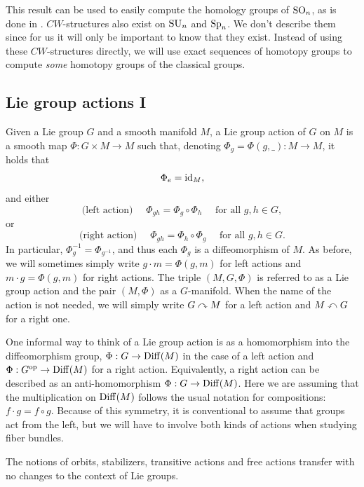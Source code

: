 This result can be used to easily compute the homology groups of $\operatorname{SO}_n$, as is done in \cite{Hatcher}. $CW$-structures also exist on $\operatorname{SU}_n$ and $\operatorname{Sp}_n$. We don't describe them since for us it will only be important to know that they exist. Instead of using these $CW$-structures directly, we will use exact sequences of homotopy groups to compute \emph{some} homotopy groups of the classical groups.





\subsection{Lie group actions I} \label{sec: Lie group actions}

\begin{defn}
    Given a Lie group $G$ and a smooth manifold $M$, a Lie group action of $G$ on $M$ is a smooth map $\Phi:G\times M\to M$ such that, denoting $\Phi_g=\Phi(g,\_):M\to M$, it holds that \[\Phi_e=\operatorname{id}_M,\] and either
    \[\text{(left action) }\quad \Phi_{gh}=\Phi_g\circ \Phi_h\quad \text{ for all } g,h\in G, \]
    or
    \[\text{(right action) }\quad \Phi_{gh}=\Phi_h\circ \Phi_g\quad \text{ for all } g,h\in G.\]
    In particular, $\Phi_{g}^{-1}=\Phi_{g^{-1}}$, and thus each $\Phi_g$ is a diffeomorphism of $M$. As before, we will sometimes simply write $g\cdot m=\Phi(g,m)$ for left actions and $m\cdot g=\Phi(g,m)$ for right actions. The triple $(M,G,\Phi)$ is referred to as a Lie group action and the pair $(M,\Phi)$ as a $G$-manifold. When the name of the action is not needed, we will simply write $G\curvearrowright M$ for a left action and $M\curvearrowleft G$ for a right one.
\end{defn}

\begin{rem}
    One informal way to think of a Lie group action is as a homomorphism into the diffeomorphism group, $\Phi:G\to \operatorname{Diff}(M)$ in the case of a left action and $\Phi:G^{\mathrm{op}}\to \operatorname{Diff}(M)$ for a right action. Equivalently, a right action can be described as an anti-homomorphism $\Phi:G\to \operatorname{Diff}(M)$. Here we are assuming that the multiplication on $\operatorname{Diff}(M)$ follows the usual notation for compositions: $f\cdot g=f\circ g$. Because of this symmetry, it is conventional to assume that groups act from the left, but we will have to involve both kinds of actions when studying fiber bundles.
\end{rem}

The notions of orbits, stabilizers, transitive actions and free actions transfer with no changes to the context of Lie groups.

